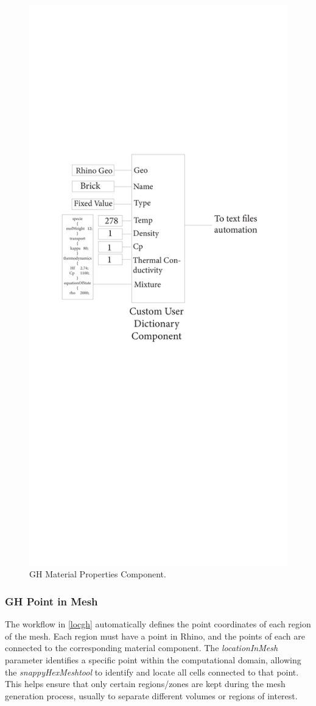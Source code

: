 \begin{figure}[tbh]
\centering
\includegraphics[trim=5cm 32cm 4.5cm 7cm, clip, width=0.55\linewidth]{Figures/THESISGH2.pdf}
\hspace{0.7cm}
\caption{\gls{GH} Material Properties Component.}
\label{matgh}
\end{figure}





\subsubsection{\gls{GH} Point in Mesh}
The workflow in \ref{locgh} automatically defines the point coordinates of each region of the mesh. Each region must have a point in Rhino, and the points of each are connected to the corresponding material component. The \textit{locationInMesh} parameter identifies a specific point within the computational domain, allowing the \textit{snappyHexMeshtool} to identify and locate all cells connected to that point. This helps ensure that only certain regions/zones are kept during the mesh generation process, usually to separate different volumes or regions of interest.

